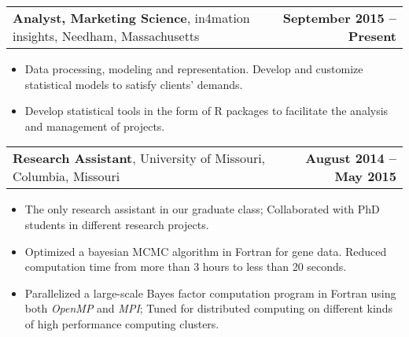 \documentclass[11pt]{article}
\makeatletter
\newcommand{\headerrow}[2]
{\begin{tabular*}{\linewidth}{l@{\extracolsep{\fill}}r}
	#1 & #2 \\
\end{tabular*}
}
\makeatother
\begin{document}
\headerrow
{\textbf{Analyst, Marketing Science}, in4mation insights, Needham, Massachusetts}
{\textbf{September 2015 – Present}}
\begin{itemize}
    \item Data processing, modeling and representation. Develop and customize statistical models to satisfy clients' demands. 
    \item Develop statistical tools in the form of R packages to facilitate the analysis and management of projects.
\end{itemize}


\noindent\headerrow
{\textbf{Research Assistant}, University of Missouri, Columbia, Missouri}
{\textbf{August 2014 – May 2015}}
\begin{itemize}
	\item The only research assistant in our graduate class; Collaborated with PhD students in different research projects.
	\item Optimized a bayesian MCMC algorithm in Fortran for gene data. Reduced computation time from more than 3 hours to less than 20 seconds.
	\item Parallelized a large-scale Bayes factor computation program in Fortran using both \emph{OpenMP} and \emph{MPI}; Tuned for distributed computing on different kinds of high performance computing clusters.
\end{itemize}
\end{document}
